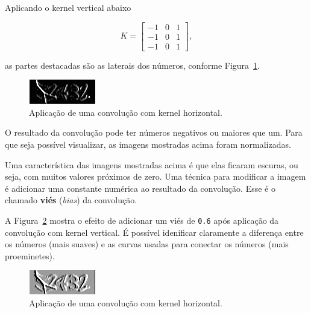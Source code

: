 \documentclass[12pt,twoside,brazilian]{book}
\begin{document}
Aplicando o kernel vertical abaixo

\[
K = \left[\begin{array}{rrr}-1&0&1\\-1&0&1\\-1&0&1\end{array}\right],
\]

as partes destacadas são as laterais dos números, conforme
Figura~\ref{fig-tjmg-exemplo-conv-vertical}.

\begin{figure}

{\centering \includegraphics[width=1.14583in,height=\textheight]{./assets/img/tjmg_conv_vertical.jpeg}

}

\caption{\label{fig-tjmg-exemplo-conv-vertical}Aplicação de uma
convolução com kernel horizontal.}

\end{figure}

O resultado da convolução pode ter números negativos ou maiores que um.
Para que seja possível visualizar, as imagens mostradas acima foram
normalizadas.

Uma característica das imagens mostradas acima é que elas ficaram
escuras, ou seja, com muitos valores próximos de zero. Uma técnica para
modificar a imagem é adicionar uma constante numérica ao resultado da
convolução. Esse é o chamado \textbf{viés} (\emph{bias}) da convolução.

A Figura~\ref{fig-tjmg-exemplo-conv-vertical-bias} mostra o efeito de
adicionar um viés de \texttt{0.6} após aplicação da convolução com
kernel vertical. É possível idenificar claramente a diferença entre os
números (mais suaves) e as curvas usadas para conectar os números (mais
proeminetes).

\begin{figure}

{\centering \includegraphics[width=1.14583in,height=\textheight]{./assets/img/tjmg_conv_vertical_bias.jpeg}

}

\caption{\label{fig-tjmg-exemplo-conv-vertical-bias}Aplicação de uma
convolução com kernel horizontal.}

\end{figure}
\end{document}
